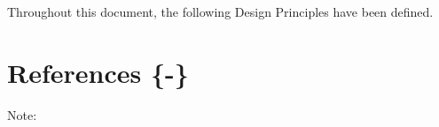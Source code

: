 \documentclass[sort&compress,preprint,authoryear,3p,twocolumn]{elsarticle}
\begin{document}
\onecolumn

Throughout this document, the following Design Principles have been defined. 


\twocolumn

\hypertarget{references--}{%
\section{References \{-\}}\label{references--}}

\setlength{\parindent}{-0.2in}

\setlength{\leftskip}{0.2in}

\setlength{\parskip}{8pt}

Note:



\end{document}
